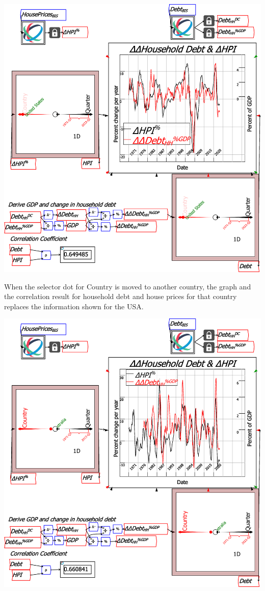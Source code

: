 \includegraphics[width=15cm]{images/RavelLinking}

When the selector dot for Country is moved to another country, the
graph and the correlation result for household debt and house prices
for that country replaces the information shown for the USA.

\includegraphics[width=15cm]{images/RavelLinking2ndCountry}

